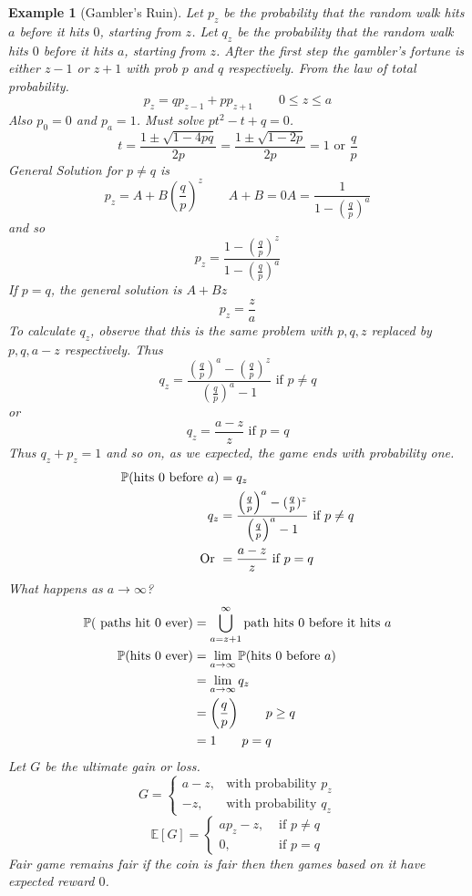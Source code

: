 \documentclass{notes}
\theoremstyle{plain}
\newtheorem*{example}{Example}
\newcommand{\bP}{\mathbb{P}}
\newcommand{\bE}{\mathbb{E}}
\newcommand{\prob}[1]{\bP \negthinspace\left(#1\right)}
\newcommand{\expect}[1]{\bE\!\left[#1\right]}
\begin{document}
\begin{example}[Gambler's Ruin]
\vspace{3in}
Let $p_z$ be the probability that the random walk hits $a$ before it
hits $0$, starting from $z$. Let $q_z$ be the probability that the
random walk hits $0$ before it hits $a$, starting from $z$. After the
first step the gambler's fortune is either $z-1$ or $z+1$ with prob
$p$ and $q$ respectively. From the law of total probability.
\[
p_z = qp_{z-1} +pp_{z+1} \qquad 0\le z \le a
\]
Also $p_0 = 0$ and $p_a = 1$.  Must solve $pt^2 -t+q =0$.
\[
t = \frac{1 \pm \sqrt{1-4pq}}{2p} = \frac{1\pm \sqrt{1-2p}}{2p} = 1
\text{ or } \frac{q}{p}
\]
General Solution for $p\neq q$ is
\[
p_z =  A + B\left(\frac{q}{p}\right)^z \qquad A+B = 0  
A= \frac{1}{1-\left(\frac{q}{p}\right)^a}
\]
and so
\[
p_z = \frac{1 - \left(\frac{q}{p}\right)^z}{1-\left(\frac{q}{p}\right)^a}
\]
If $p = q$, the general solution is $A + B z$
\[
p_z = \frac{z}{a}
\]
To calculate $q_z$, observe that this is the same problem with $p,q,z$
replaced by $p,q,a-z$ respectively. Thus
\[
q_z = \frac{\left(\frac{q}{p}\right)^a- \left(\frac{q}{p}\right)^z}
{\left(\frac{q}{p}\right)^a - 1}\text{ if $p\neq q$}
\] 
or
\[
q_z = \frac{a-z}{z} \text{ if $p=q$}
\]
Thus $q_z+p_z=1$ and so on, as we expected, the game ends with
probability one.
\begin{align*}
\prob{\text{hits $0$ before $a$}} &= q_z\\
q_z &= \frac{\left(\frac{q}{p}\right)^a- (\frac{q}{p})^z}{\left(
\frac{q}{p}\right)^a - 1}\text{ if $p\neq q$}\\
\text{Or } &= \frac{a-z}{z} \text{ if $p=q$}
\end{align*}
What happens as $a \to \infty$? 
\begin{align*}
\prob{\text{ paths hit $0$ ever}}&=
\bigcup_{a=z+1}^{\infty}{\text{path hits $0$ before it hits $a$}}\\
\prob{\text{hits $0$ ever}} &= \lim_{a\to \infty}\prob{\text{hits $0$
    before $a$}}\\
&= \lim_{a\to\infty}q_z\\
&= \left(\frac{q}{p}\right) \qquad  p\ge q\\
&= 1 \qquad p=q
\end{align*}
Let $G$ be the ultimate gain or loss.
\begin{equation}
G=
\begin{cases}
a-z, &\text{with probability $p_z$}\\
-z, &\text{with probability $q_z$}
\end{cases}
\end{equation}
\begin{equation}
\expect{G} = 
\begin{cases}
ap_z -z, &\text{ if $p\neq q$}\\
0, &\text{ if $p=q$}
\end{cases}
\end{equation}
\emph{Fair game remains fair} if the coin is fair then then games
based on it have expected reward $0$.
\end{example}
\end{document}
